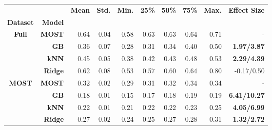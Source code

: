 \setcellgapes{1ex}\makegapedcells\centering\begin{tabular*}{\textwidth}{cr|@{\extracolsep{\fill}}rrrrrrrr}
\toprule
     &      & \textbf{Mean} & \textbf{Std.} & \textbf{Min.} & \textbf{25\%} & \textbf{50\%} & \textbf{75\%} & \textbf{Max.} & \textbf{Effect Size} \\
\textbf{Dataset} & \textbf{Model} &               &               &               &               &               &               &               &                      \\
\midrule
\multirow{4}{*}{\textbf{Full}} & \textbf{MOST} &  0.64 &  0.04 &  0.58 &  0.63 &  0.63 &  0.64 &  0.71 &  - \\
     & \textbf{GB} &  0.36 &  0.07 &  0.28 &  0.31 &  0.34 &  0.40 &  0.50 &  \textbf{1.97/3.87} \\
     & \textbf{kNN} &  0.45 &  0.05 &  0.38 &  0.42 &  0.43 &  0.48 &  0.53 &  \textbf{2.29/4.39} \\
     & \textbf{Ridge} &  0.62 &  0.08 &  0.53 &  0.57 &  0.60 &  0.64 &  0.80 &  -0.17/0.50 \\
\cline{1-10}
\multirow{4}{*}{\textbf{MOST}} & \textbf{MOST} &  0.32 &  0.02 &  0.29 &  0.31 &  0.32 &  0.34 &  0.34 &  - \\
     & \textbf{GB} &  0.18 &  0.01 &  0.15 &  0.17 &  0.18 &  0.19 &  0.19 &  \textbf{6.41/10.27} \\
     & \textbf{kNN} &  0.22 &  0.01 &  0.21 &  0.22 &  0.22 &  0.23 &  0.25 &  \textbf{4.05/6.99} \\
     & \textbf{Ridge} &  0.27 &  0.02 &  0.24 &  0.25 &  0.27 &  0.28 &  0.31 &  \textbf{1.32/2.72} \\
\bottomrule
\end{tabular*}
